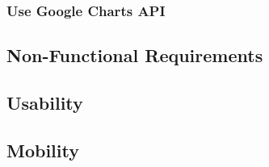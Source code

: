\subsubsection{Use Google Charts API}

\subsubsection{}

\subsection{Non-Functional Requirements}

\subsection{Usability}

\subsection{Mobility}

